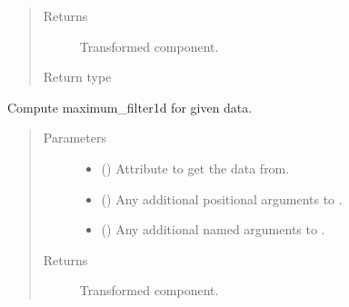 \documentclass[letterpaper,10pt,english]{sphinxmanual}
\begin{document}
\begin{fulllineitems}
\begin{fulllineitems}
\begin{quote}
\begin{description}
\begin{itemize}
\end{itemize}

\item[{Returns}] \leavevmode
{} \textendash{} Transformed component.

\item[{Return type}] \leavevmode
{\hyperref[\detokenize{api/base_classes:geology.src.base_spatial.SpatialComponent}]{}}

\end{description}\end{quote}

\end{fulllineitems}


\begin{fulllineitems}
\label{\detokenize{api/rock:geology.src.Rock.maximum_filter1d}}
Compute maximum\_filter1d for given data.
\begin{quote}\begin{description}
\item[{Parameters}] \leavevmode\begin{itemize}
\item {} 
 (\sphinxstyleliteralemphasis{\sphinxupquote{, }}) \textendash{} Attribute to get the data from.

\item {} 
 () \textendash{} Any additional positional arguments to .

\item {} 
 () \textendash{} Any additional named arguments to .

\end{itemize}

\item[{Returns}] \leavevmode
{} \textendash{} Transformed component.


\end{description}
\end{quote}
\end{fulllineitems}
\end{fulllineitems}
\end{document}
